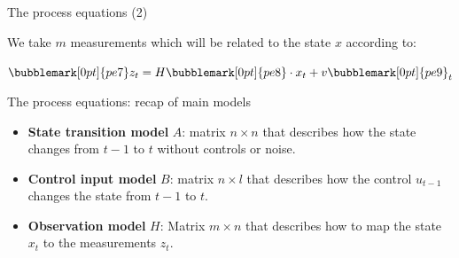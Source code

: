\documentclass[compress]{beamer}
\begin{document}
\begin{frame}{The process equations (2)}

    We take $m$ measurements which will be related to the state
  $x$ according to:

    \vspace{3em}

    \Huge\centering
    $\bubblemark[0pt]{pe7}z_t = H\bubblemark[0pt]{pe8} \cdot x_t + v\bubblemark[0pt]{pe9}_t$


\end{frame}

\begin{frame}{The process equations: recap of main models}

\begin{itemize}
    \item \textbf{State transition model} $A$: matrix $n \times n$ that describes how the state
  changes from $t-1$ to $t$ without controls or noise.
    \item \textbf{Control input model} $B$: matrix $n \times l$ that describes how the
        control $u_{t-1}$ changes the state from $t-1$ to $t$.
    \item \textbf{Observation model} $H$: Matrix $m \times n$ that describes how to map the
  state $x_t$ to the measurements $z_t$.
\end{itemize}

\end{frame}
\end{document}
